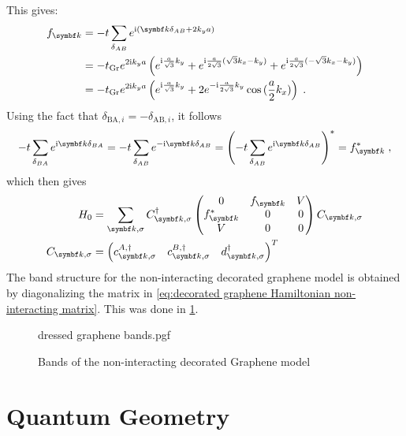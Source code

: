 \documentclass[../notes.tex]{subfiles}
\begin{document}
This gives:
\begin{align}
	f_{\vb{k}} &= -t \sum_{\delta_{AB}} e^{\iu (\vb{k} \delta_{AB} + 2 k_y a)} \\
	&= -t_{\mathrm{Gr}} e^{2 \iu k_y a} \left(
	e^{\iu \frac{a}{\sqrt{3}} k_y} +
	e^{\iu \frac{a}{2\sqrt{3}} (\sqrt{3} k_x - k_y)} +
	e^{\iu \frac{a}{2\sqrt{3}} (-\sqrt{3} k_x - k_y)} \right) \\
	&= -t_{\mathrm{Gr}} e^{2 \iu k_y a} \left(
	e^{\iu \frac{a}{\sqrt{3}} k_y} +
	2 e^{-\iu \frac{a}{2\sqrt{3}} k_y}
	\cos{(\frac{a}{2} k_x)} \right) \;.
\end{align}
Using the fact that \(\delta_{\mathrm{BA}, i} = -\delta_{\mathrm{AB}, i}\), it follows
\begin{align}
	-t \sum_{\delta_{BA}} e^{\iu \vb{k} \delta_{BA}} = -t \sum_{\delta_{AB}} e^{-\iu \vb{k} \delta_{AB}} = \left(-t \sum_{\delta_{AB}} e^{\iu \vb{k} \delta_{AB}}\right)^* = f_{\vb{k}}^* \;,
\end{align}
which then gives
\begin{align}
	H_0 &= \sum_{\vb{k}, \sigma} C_{\vb{k}, \sigma}^{\dagger}
	\begin{pmatrix}
		0 & f_{\vb{k}} & V \\
		f_{\vb{k}}^* & 0 & 0 \\
		V & 0 & 0
	\end{pmatrix} C_{\vb{k}, \sigma}
	\label{eq:decorated graphene Hamiltonian non-interacting matrix} \\
	 C_{\vb{k}, \sigma} &= \begin{pmatrix} c_{\vb{k}, \sigma}^{A, \dagger} & c_{\vb{k}, \sigma}^{B, \dagger} & d_{\vb{k}, \sigma}^{\dagger} \end{pmatrix}^T
\end{align}
The band structure for the non-interacting decorated graphene model is obtained by diagonalizing the matrix in \cref{eq:decorated graphene Hamiltonian non-interacting matrix}.
This was done in \cref{fig:decorated graphene model non-interacting bands}.
\begin{figure}[t]
	\centering
	 {dressed graphene bands.pgf}
	\caption{Bands of the non-interacting  decorated Graphene model}
	\label{fig:decorated graphene model non-interacting bands}
\end{figure}

\section{Quantum Geometry}

\end{document}
